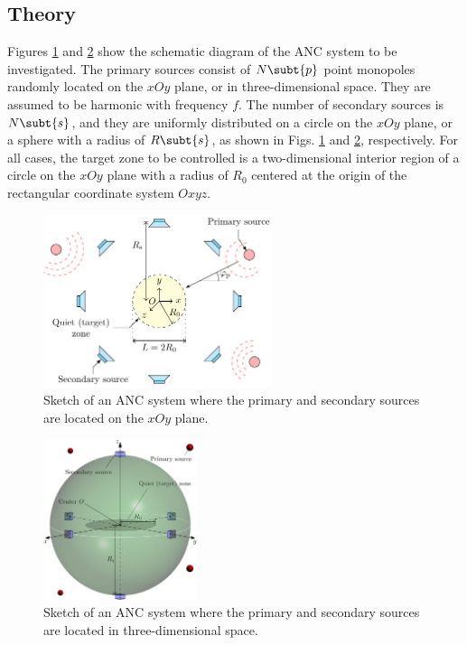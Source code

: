 \subsection{Theory}
Figures \ref{fig:ancpal:sketch2d} and \ref{fig:ancpal:sketch3d} show the schematic diagram of the ANC system to be investigated. 
The primary sources consist of $N\subt{p}$ point monopoles randomly located on the $xOy$ plane, or in three-dimensional space. 
They are assumed to be harmonic with frequency $f$. 
The number of secondary sources is $N\subt{s}$, and they are uniformly distributed on a circle on the $xOy$ plane, or a sphere with a radius of $R\subt{s}$, as shown in Figs. \ref{fig:ancpal:sketch2d} and \ref{fig:ancpal:sketch3d}, respectively. 
For all cases, the target zone to be controlled is a two-dimensional interior region of a circle on the $xOy$ plane with a radius of $R_0$ centered at the origin of the rectangular coordinate system $Oxyz$.
\begin{figure}[!htb]
    \centering
    \includegraphics[width = 0.6\textwidth]{fig/sketch_v5.pdf}
    \caption{Sketch of an ANC system where the primary and secondary sources are located on the $xOy$ plane. }
    \label{fig:ancpal:sketch2d}
\end{figure}

\begin{figure}[!htb]
    \centering
    \includegraphics[width = 0.4\textwidth]{fig/ANC3D_resize.jpg}
    \caption{Sketch of an ANC system where the primary and secondary sources are located in three-dimensional space.}
    \label{fig:ancpal:sketch3d}
\end{figure}


